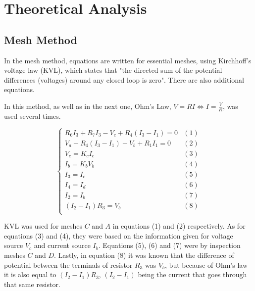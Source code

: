 \section{Theoretical Analysis}
\label{sec:analysis}
\subsection{Mesh Method}
\par
In the mesh method, equations are written for essential meshes, using Kirchhoff's voltage law (KVL), which states that "the directed sum of the potential differences (voltages) around any closed loop is zero". There are also additional equations.

\par
In this method, as well as in the next one, Ohm's Law, $V=RI \Leftrightarrow I = \frac{V}{R}$, was used several times.


\begin{equation}
\begin{cases}
R_6 I_3 + R_7 I_3 - V_c + R_4(I_3-I_1) = 0 & \mbox{$(1)$}\\
V_a - R_4 (I_3-I_1) - V_b + R_1 I_1 = 0 & \mbox{$(2)$}\\
V_c = K_c I_c & \mbox{$(3)$} \\
I_b = K_b V_b & \mbox{$(4)$} \\
I_3 = I_c & \mbox{$(5)$}\\
I_4 = I_d & \mbox{$(6)$}\\
I_2 = I_b & \mbox{$(7)$}\\
(I_2-I_1) R_3 = V_b & \mbox{$(8)$}\\
\end{cases}
\end{equation}

\par
KVL was used for meshes $C$ and $A$ in equations (1) and (2) respectively. As for equations (3) and (4), they were based on the information given for voltage source $V_c$ and current source $I_b$. Equations (5), (6) and (7) were by inspection meshes $C$ and $D$. Lastly, in equation (8) it was known that the difference of potential between the terminals of resistor $R_3$ was $V_b$, but because of Ohm's law it is also equal to $(I_2-I_1) R_3$, $(I_2-I_1)$ being the current that goes through that same resistor.

